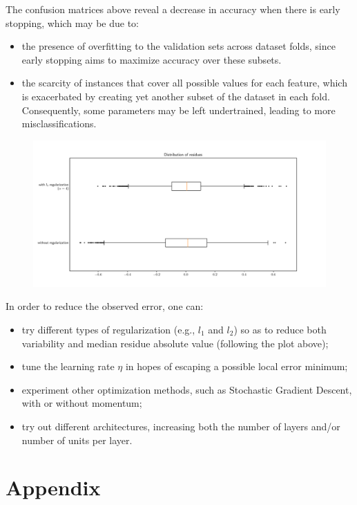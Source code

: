 \documentclass{exam}
\begin{document}
\begin{questions}
\begin{figure}[H]
\begin{minipage}[b]{0.49\textwidth}
            \end{minipage}
        \end{figure}
        \vspace{-1em}
        The confusion matrices above reveal a decrease in accuracy when there is early stopping, which may be due to:
        \vspace{-0.5em}
        \begin{itemize}
            \item the presence of overfitting to the validation sets across dataset folds, since early stopping aims to maximize accuracy over these subsets.
            \item the scarcity of instances that cover all possible values for each feature, which is exacerbated by creating yet another subset of the dataset in each fold. Consequently, some parameters may be left undertrained, leading to more misclassifications.
        \end{itemize}
        \item \quad
        \vspace{-0.45cm}
        \begin{figure}[H]
            \centering
              \includegraphics[width=\textwidth]{residue_boxplot.pdf}
        \end{figure}
        In order to reduce the observed error, one can:
        \begin{itemize}
            \item try different types of regularization (e.g., $l_1$ and $l_2$) so as to reduce both variability and median residue absolute value (following the plot above);
            \item tune the learning rate $\eta$ in hopes of escaping a possible local error minimum;
            \item experiment other optimization methods, such as Stochastic Gradient Descent, with or without momentum;
            \item try out different architectures, increasing both the number of layers and/or number of units per layer.
        \end{itemize}
          
    \end{questions}

    \pagebreak
    \section{Appendix}
    \inputminted{python}{src/ex02.py}
   
    
    
\end{document}

